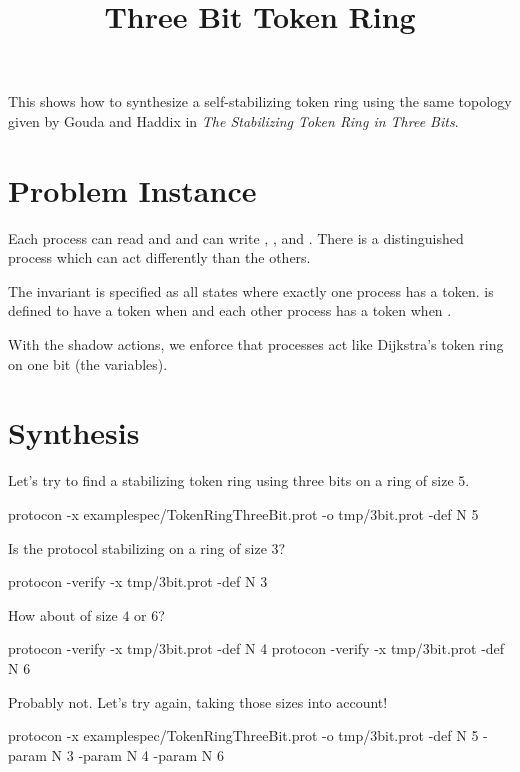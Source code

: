 
\title{Three Bit Token Ring}
\date{}



This shows how to synthesize a self-stabilizing token ring using the same topology given by 
Gouda and Haddix in \textit{The Stabilizing Token Ring in Three Bits}.

\section{Problem Instance}


Each process can read  and  and can write , , and .
There is a distinguished process  which can act differently than the others.

The invariant is specified as all states where exactly one process has a token.
 is defined to have a token when  and each other  process has a token when .

With the shadow actions, we enforce that processes act like Dijkstra's token ring on one bit (the  variables).

\section{Synthesis}

Let's try to find a stabilizing token ring using three bits on a ring of size $5$.
\begin{code}
protocon -x examplespec/TokenRingThreeBit.prot -o tmp/3bit.prot -def N 5
\end{code}

Is the protocol stabilizing on a ring of size $3$?
\begin{code}
protocon -verify -x tmp/3bit.prot -def N 3
\end{code}

How about of size $4$ or $6$?
\begin{code}
protocon -verify -x tmp/3bit.prot -def N 4
protocon -verify -x tmp/3bit.prot -def N 6
\end{code}

Probably not.
Let's try again, taking those sizes into account!
\begin{code}
protocon -x examplespec/TokenRingThreeBit.prot -o tmp/3bit.prot -def N 5 -param N 3 -param N 4 -param N 6
\end{code}

